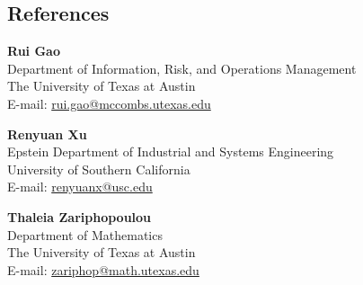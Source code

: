\documentclass[margin,line]{res}
\begin{document}
\begin{resume}
\section{\sc References}
\begin{minipage}[t]{0.8\textwidth}
  \textbf{Rui Gao}\\
  Department of Information, Risk, and Operations Management\\
  The University of Texas at Austin\\
  E-mail: \href{mailto: rui.gao@mccombs.utexas.edu}{ rui.gao@mccombs.utexas.edu}
\end{minipage}

\begin{minipage}[t]{0.8\textwidth}
  \textbf{Renyuan Xu}\\
  Epstein Department of Industrial and Systems Engineering\\
  University of Southern California\\
  E-mail: \href{mailto: renyuanx@usc.edu}{ renyuanx@usc.edu}
\end{minipage}


\begin{minipage}[t]{0.8\textwidth}
  \textbf{Thaleia Zariphopoulou}\\
  Department of Mathematics\\
  The University of Texas at Austin\\
  E-mail: \href{mailto:zariphop@math.utexas.edu}{zariphop@math.utexas.edu}
\end{minipage}







\end{resume}
\end{document}
